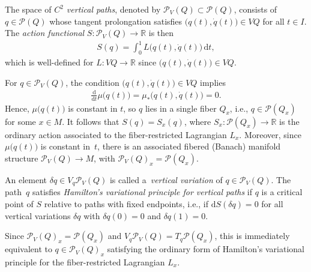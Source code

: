 \documentclass[pdftex]{sigma}
\numberwithin{equation}{section}
\begin{document}
\begin{Definition} The space of \emph{$ C ^2 $ vertical paths}, denoted by $ \mathcal{P} _V (Q) \subset \mathcal{P} (Q) $, consists of $ q \in \mathcal{P} (Q) $ whose tangent prolongation satisf\/ies $ \bigl( q (t) , \dot{q} (t) \bigr) \in V Q $ for all $ t \in I $. The \emph{action functional} $ S \colon \mathcal{P} _V (Q) \rightarrow \mathbb{R} $ is then
 \begin{gather*}
 S (q) = \int _0 ^1 L \bigl( q (t) , \dot{q} (t) \bigr) \,\mathrm{d}t ,
 \end{gather*}
which is well-def\/ined for $ L \colon V Q \rightarrow \mathbb{R} $ since $ \bigl( q (t) , \dot{q} (t) \bigr) \in V Q $.
\end{Definition}

\begin{Remark} For $ q \in \mathcal{P} _V (Q) $, the condition $ \bigl( q (t) , \dot{q} (t) \bigr) \in V Q $ implies
 \begin{gather*}
 \frac{\mathrm{d}}{\mathrm{d}t} \mu \bigl( q (t) \bigr) = \mu _\ast \bigl( q (t) , \dot{q} (t) \bigr) = 0 .
 \end{gather*}
Hence, $ \mu \bigl( q (t) \bigr) $ is constant in $t$, so $q$ lies in a single f\/iber $ Q _x $, i.e., $ q \in \mathcal{P} ( Q _x ) $ for some $ x \in M $. It follows that $ S (q) = S _x ( q ) $, where $ S _x \colon \mathcal{P} ( Q _x ) \rightarrow \mathbb{R} $ is the ordinary action associated to the f\/iber-restricted Lagrangian $ L _x $. Moreover, since $ \mu \bigl( q (t) \bigr) $ is constant in~$t$, there is an associated f\/ibered (Banach) manifold structure $ \mathcal{P} _V (Q) \rightarrow M $, with $ \mathcal{P} _V (Q) _x = \mathcal{P} ( Q _x ) $.
\end{Remark}

\begin{Definition} \label{def:verticalHamilton}
An element $ \delta q \in V _q \mathcal{P} _V (Q) $ is called a~\emph{vertical variation} of $ q \in \mathcal{P} _V (Q) $. The path~$q$ satisf\/ies \emph{Hamilton's variational principle for vertical paths} if $q$ is a critical point of $S$ relative to paths with f\/ixed endpoints, i.e., if $ \mathrm{d} S ( \delta q ) = 0 $ for all vertical variations $ \delta q $ with $ \delta q (0) = 0 $ and $ \delta q (1) = 0 $.
\end{Definition}

\begin{Remark} Since $ \mathcal{P} _V (Q) _x = \mathcal{P} ( Q _x ) $ and $ V _q \mathcal{P} _V (Q) = T _q \mathcal{P} ( Q _x ) $, this is immediately equivalent to $q \in \mathcal{P} _V (Q) _x $ satisfying the ordinary form of Hamilton's variational principle for the f\/iber-restricted Lagrangian $ L _x $.
\end{Remark}
\end{document}
